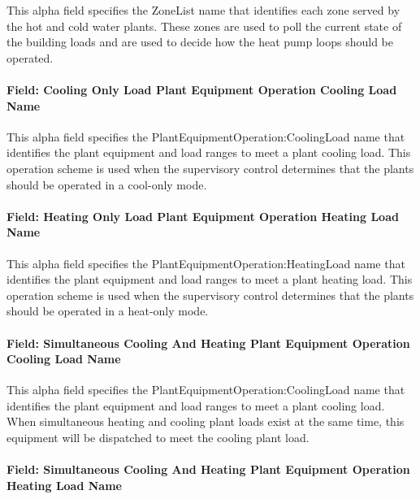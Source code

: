 This alpha field specifies the ZoneList name that identifies each zone served by the hot and cold water plants. These zones are used to poll the current state of the building loads and are used to decide how the heat pump loops should be operated. 

\paragraph{Field: Cooling Only Load Plant Equipment Operation Cooling Load Name}\label{field-cool-only-load-equip-operation-name-plantequipmentoperationchillerheaterchangeover}

This alpha field specifies the PlantEquipmentOperation:CoolingLoad name that identifies the plant equipment and load ranges to meet a plant cooling load. This operation scheme is used when the supervisory control determines that the plants should be operated in a cool-only mode. 

\paragraph{Field: Heating Only Load Plant Equipment Operation Heating Load Name}\label{field-heat-only-load-equip-operation-name-plantequipmentoperationchillerheaterchangeover}

This alpha field specifies the PlantEquipmentOperation:HeatingLoad name that identifies the plant equipment and load ranges to meet a plant heating load. This operation scheme is used when the supervisory control determines that the plants should be operated in a heat-only mode. 

\paragraph{Field: Simultaneous Cooling And Heating Plant Equipment Operation Cooling Load Name}\label{field-simulataneous-cooling-and-heating-plant-equip-operation-name-plantequipmentoperationchillerheaterchangeover}

This alpha field specifies the PlantEquipmentOperation:CoolingLoad name that identifies the plant equipment and load ranges to meet a plant cooling load. When simultaneous heating and cooling plant loads exist at the same time, this equipment will be dispatched to meet the cooling plant load.

\paragraph{Field: Simultaneous Cooling And Heating Plant Equipment Operation Heating Load Name}\label{field-simulataneous-cooling-and-heating-plant-equip-operation-name-plantequipmentoperationchillerheaterchangeover}

